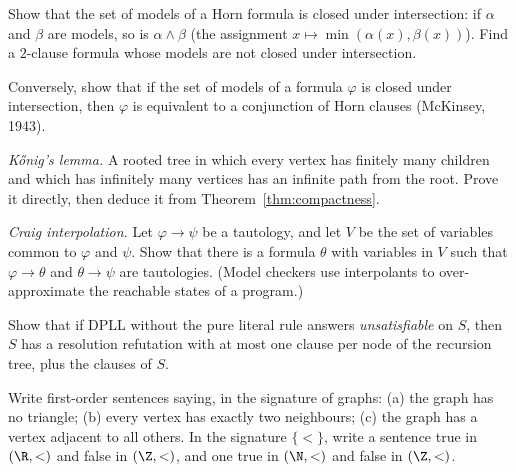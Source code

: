 \begin{exercise}[$\star\star$]\label{ex:hornmodels}
Show that the set of models of a Horn formula is closed under intersection: if $\alpha$ and $\beta$ are models, so is $\alpha\land\beta$ (the
assignment $x\mapsto\min(\alpha(x),\beta(x))$). Find a $2$-clause formula whose models are not closed under intersection.
\end{exercise}

\begin{exercise}[$\star\star\star$]\label{ex:hornconverse}
Conversely, show that if the set of models of a formula $\varphi$ is closed under intersection, then $\varphi$ is equivalent to a
conjunction of Horn clauses (McKinsey, 1943).
\end{exercise}

\begin{exercise}[$\star\star$]\label{ex:konig}
\emph{K\H onig's lemma.} A rooted tree in which every vertex has finitely many children and which has infinitely many
vertices has an infinite path from the root. Prove it directly, then deduce it from Theorem~\ref{thm:compactness}.
\end{exercise}

\begin{exercise}[$\star\star$]\label{ex:interpolation}
\emph{Craig interpolation.} Let $\varphi\to\psi$ be a tautology, and let $V$ be the set of variables common to $\varphi$ and $\psi$. Show
that there is a formula $\theta$ with variables in $V$ such that $\varphi\to\theta$ and $\theta\to\psi$ are tautologies. (Model checkers use
interpolants to over-approximate the reachable states of a program.)
\end{exercise}

\begin{exercise}[$\star\star$]\label{ex:dpllres}
Show that if DPLL without the pure literal rule answers \emph{unsatisfiable} on $S$, then $S$ has a resolution refutation with
at most one clause per node of the recursion tree, plus the clauses of $S$.
\end{exercise}

\begin{exercise}[$\star$]\label{ex:fosentences}
Write first-order sentences saying, in the signature of graphs: (a) the graph has no triangle; (b) every vertex has
exactly two neighbours; (c) the graph has a vertex adjacent to all others. In the signature $\{<\}$, write a sentence true
in $(\R,<)$ and false in $(\Z,<)$, and one true in $(\N,<)$ and false in $(\Z,<)$.
\end{exercise}

